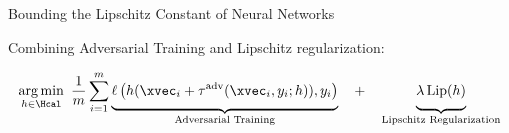 \begin{frame}{Bounding the Lipschitz Constant of Neural Networks}

  Combining Adversarial Training and Lipschitz regularization: 

  \begin{equation}
    \argmin_{h \in \Hcal} \ \frac{1}{m} \sum_{i = 1}^{m} \underbrace{\vphantom{\frac{1}{1}} \ell \left( h (\xvec_i + \tau^{\mathrm{adv}}(\xvec_i, y_i; h)), y_i \right)}_{\text{Adversarial Training}} \quad + \quad \underbrace{ \vphantom{\frac{1}{1}} \lambda \lip(h)}_{\text{Lipschitz Regularization}}
  \end{equation}

  \begin{minipage}{\textwidth}
    \centering
  \end{minipage}


\end{frame}
